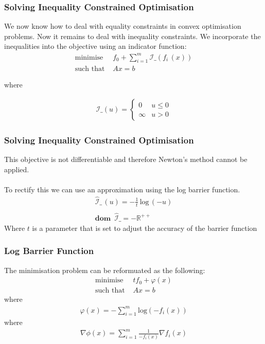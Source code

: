 \documentclass{beamer}
\def\rnum{\mathbb{R}}
\begin{document}
\begin{frame}
    \frametitle{Solving Inequality Constrained Optimisation}
    We now know how to deal with equality constraints in convex optimisation
    problems. Now it remains to deal with inequality constraints.
    We incorporate the inequalities into the objective using an indicator
    function:
    \begin{align*}
        \text{minimise } \, &f_{0} +
        \sum_{i=1}^{m}\mathcal{I}\_\left(f_{i}\,(x)\right )\\
        \text{such that } & Ax =b
    \end{align*}

where

\begin{align*}
    \mathcal{I}\_(u) =
    \begin{cases}
        0 &u \leq 0 \\
        \infty &u > 0
    \end{cases}
\end{align*}
\end{frame}

\begin{frame}
    \frametitle{Solving Inequality Constrained Optimisation}
    This objective is not differentiable and therefore Newton's method cannot be
    applied.
    \\~\\
    To rectify this we can use an approximation using the log barrier function.
    \begin{align*}
        \hat{\mathcal{I}}\_\, (u) = -\frac{1}{t}\, \text{log}\,(-u) \\\\
        \mathbf{dom} \,\,\,\hat{\mathcal{I}}\_ = -\rnum^{++}
    \end{align*}
    Where $t$ is a parameter that is set to adjust the accuracy of the barrier
    function
\end{frame}

\begin{frame}
    \frametitle{Log Barrier Function}
    The minimisation problem can be reformuated as the following:
    \begin{align*}
        \text{minimise } \, &t f_{0} +
        \varphi(x)\\
        \text{such that } & Ax =b
    \end{align*}
    where
    \begin{align*}
        \varphi(x) = - \sum\limits_{i=1}^{m}\text{log}(-f_{i}(x))
    \end{align*}
    where
    \begin{align*}
        \nabla \phi(x) = \sum\limits_{i=1}^{m}\frac{1}{-f_{i}(x)}\nabla f_{i}(x)
    \end{align*}
\end{frame}
\end{document}
